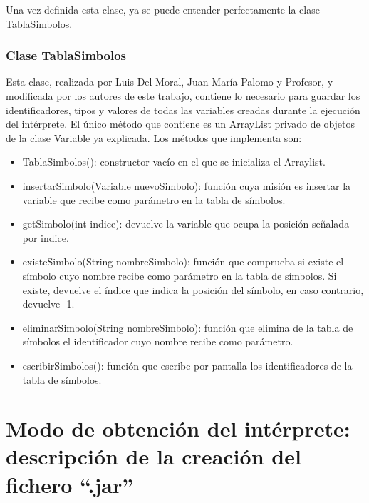 \documentclass[a4paper,12pt,twoside,openright]{report}
\begin{document}
  Una vez definida esta clase, ya se puede entender perfectamente la clase TablaSimbolos.
  \subsection{Clase TablaSimbolos}
  Esta clase, realizada por Luis Del Moral, Juan María Palomo y Profesor, y modificada por los autores de este trabajo, 
  contiene lo necesario para guardar los identificadores, tipos y valores de todas las variables creadas durante la ejecución 
  del intérprete.
  El único método que contiene es un ArrayList privado de objetos de la clase Variable ya explicada.
  Los métodos que implementa son:
  \begin{itemize}
   \item TablaSimbolos(): constructor vacío en el que se inicializa el Arraylist.
   \item insertarSimbolo(Variable nuevoSimbolo): función cuya misión es insertar la variable que recibe
   como parámetro en la tabla de símbolos.
   \item getSimbolo(int indice): devuelve la variable que ocupa la posición señalada por indice.
   \item existeSimbolo(String nombreSimbolo): función que comprueba si existe el símbolo cuyo nombre recibe como 
   parámetro en la tabla de símbolos. Si existe, devuelve el índice que indica la posición del símbolo, en caso contrario, 
   devuelve -1.
   \item eliminarSimbolo(String nombreSimbolo): función que elimina de la tabla de símbolos el identificador cuyo nombre recibe como 
   parámetro.
   \item escribirSimbolos(): función que escribe por pantalla los identificadores de la tabla de símbolos.
  \end{itemize}

\chapter{Modo de obtención del intérprete: descripción de la creación del fichero ``.jar''}
\end{document}
